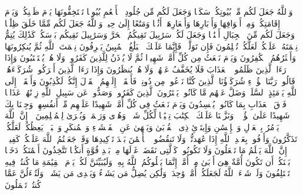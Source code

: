 \stopbuffer
\startbuffer[\q:16:80]
وَٱللَّهُ جَعَلَ لَكُم مِّنۢ بُیُوتِكُمۡ سَكَنࣰا وَجَعَلَ لَكُم مِّن جُلُودِ ٱلۡأَنۡعَٰمِ بُیُوتࣰا تَسۡتَخِفُّونَهَا یَوۡمَ ظَعۡنِكُمۡ وَیَوۡمَ إِقَامَتِكُمۡ وَمِنۡ أَصۡوَافِهَا وَأَوۡبَارِهَا وَأَشۡعَارِهَاۤ أَثَٰثࣰا وَمَتَٰعًا إِلَىٰ حِینࣲ%
\stopbuffer
\startbuffer[\q:16:81]
وَٱللَّهُ جَعَلَ لَكُم مِّمَّا خَلَقَ ظِلَٰلࣰا وَجَعَلَ لَكُم مِّنَ ٱلۡجِبَالِ أَكۡنَٰنࣰا وَجَعَلَ لَكُمۡ سَرَٰبِیلَ تَقِیكُمُ ٱلۡحَرَّ وَسَرَٰبِیلَ تَقِیكُم بَأۡسَكُمۡۚ كَذَٰلِكَ یُتِمُّ نِعۡمَتَهُۥ عَلَیۡكُمۡ لَعَلَّكُمۡ تُسۡلِمُونَ%
\stopbuffer
\startbuffer[\q:16:82]
فَإِن تَوَلَّوۡا۟ فَإِنَّمَا عَلَیۡكَ ٱلۡبَلَٰغُ ٱلۡمُبِینُ%
\stopbuffer
\startbuffer[\q:16:83]
یَعۡرِفُونَ نِعۡمَتَ ٱللَّهِ ثُمَّ یُنكِرُونَهَا وَأَكۡثَرُهُمُ ٱلۡكَٰفِرُونَ%
\stopbuffer
\startbuffer[\q:16:84]
وَیَوۡمَ نَبۡعَثُ مِن كُلِّ أُمَّةࣲ شَهِیدࣰا ثُمَّ لَا یُؤۡذَنُ لِلَّذِینَ كَفَرُوا۟ وَلَا هُمۡ یُسۡتَعۡتَبُونَ%
\stopbuffer
\startbuffer[\q:16:85]
وَإِذَا رَءَا ٱلَّذِینَ ظَلَمُوا۟ ٱلۡعَذَابَ فَلَا یُخَفَّفُ عَنۡهُمۡ وَلَا هُمۡ یُنظَرُونَ%
\stopbuffer
\startbuffer[\q:16:86]
وَإِذَا رَءَا ٱلَّذِینَ أَشۡرَكُوا۟ شُرَكَاۤءَهُمۡ قَالُوا۟ رَبَّنَا هَٰۤؤُلَاۤءِ شُرَكَاۤؤُنَا ٱلَّذِینَ كُنَّا نَدۡعُوا۟ مِن دُونِكَۖ فَأَلۡقَوۡا۟ إِلَیۡهِمُ ٱلۡقَوۡلَ إِنَّكُمۡ لَكَٰذِبُونَ%
\stopbuffer
\startbuffer[\q:16:87]
وَأَلۡقَوۡا۟ إِلَى ٱللَّهِ یَوۡمَئِذٍ ٱلسَّلَمَۖ وَضَلَّ عَنۡهُم مَّا كَانُوا۟ یَفۡتَرُونَ%
\stopbuffer
\startbuffer[\q:16:88]
ٱلَّذِینَ كَفَرُوا۟ وَصَدُّوا۟ عَن سَبِیلِ ٱللَّهِ زِدۡنَٰهُمۡ عَذَابࣰا فَوۡقَ ٱلۡعَذَابِ بِمَا كَانُوا۟ یُفۡسِدُونَ%
\stopbuffer
\startbuffer[\q:16:89]
وَیَوۡمَ نَبۡعَثُ فِی كُلِّ أُمَّةࣲ شَهِیدًا عَلَیۡهِم مِّنۡ أَنفُسِهِمۡۖ وَجِئۡنَا بِكَ شَهِیدًا عَلَىٰ هَٰۤؤُلَاۤءِۚ وَنَزَّلۡنَا عَلَیۡكَ ٱلۡكِتَٰبَ تِبۡیَٰنࣰا لِّكُلِّ شَیۡءࣲ وَهُدࣰى وَرَحۡمَةࣰ وَبُشۡرَىٰ لِلۡمُسۡلِمِینَ%
\stopbuffer
\startbuffer[\q:16:90]
۞ إِنَّ ٱللَّهَ یَأۡمُرُ بِٱلۡعَدۡلِ وَٱلۡإِحۡسَٰنِ وَإِیتَاۤئِ ذِی ٱلۡقُرۡبَىٰ وَیَنۡهَىٰ عَنِ ٱلۡفَحۡشَاۤءِ وَٱلۡمُنكَرِ وَٱلۡبَغۡیِۚ یَعِظُكُمۡ لَعَلَّكُمۡ تَذَكَّرُونَ%
\stopbuffer
\startbuffer[\q:16:91]
وَأَوۡفُوا۟ بِعَهۡدِ ٱللَّهِ إِذَا عَٰهَدتُّمۡ وَلَا تَنقُضُوا۟ ٱلۡأَیۡمَٰنَ بَعۡدَ تَوۡكِیدِهَا وَقَدۡ جَعَلۡتُمُ ٱللَّهَ عَلَیۡكُمۡ كَفِیلًاۚ إِنَّ ٱللَّهَ یَعۡلَمُ مَا تَفۡعَلُونَ%
\stopbuffer
\startbuffer[\q:16:92]
وَلَا تَكُونُوا۟ كَٱلَّتِی نَقَضَتۡ غَزۡلَهَا مِنۢ بَعۡدِ قُوَّةٍ أَنكَٰثࣰا تَتَّخِذُونَ أَیۡمَٰنَكُمۡ دَخَلَۢا بَیۡنَكُمۡ أَن تَكُونَ أُمَّةٌ هِیَ أَرۡبَىٰ مِنۡ أُمَّةٍۚ إِنَّمَا یَبۡلُوكُمُ ٱللَّهُ بِهِۦۚ وَلَیُبَیِّنَنَّ لَكُمۡ یَوۡمَ ٱلۡقِیَٰمَةِ مَا كُنتُمۡ فِیهِ تَخۡتَلِفُونَ%
\stopbuffer
\startbuffer[\q:16:93]
وَلَوۡ شَاۤءَ ٱللَّهُ لَجَعَلَكُمۡ أُمَّةࣰ وَٰحِدَةࣰ وَلَٰكِن یُضِلُّ مَن یَشَاۤءُ وَیَهۡدِی مَن یَشَاۤءُۚ وَلَتُسۡءَلُنَّ عَمَّا كُنتُمۡ تَعۡمَلُونَ%
